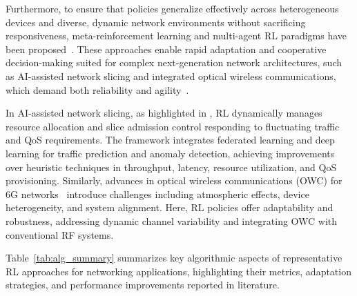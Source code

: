 \documentclass[sigconf]{acmart}
\begin{document}
Furthermore, to ensure that policies generalize effectively across heterogeneous devices and diverse, dynamic network environments without sacrificing responsiveness, meta-reinforcement learning and multi-agent RL paradigms have been proposed~\cite{ref14,ref6}. These approaches enable rapid adaptation and cooperative decision-making suited for complex next-generation network architectures, such as AI-assisted network slicing and integrated optical wireless communications, which demand both reliability and agility~\cite{ref6,ref14}.

In AI-assisted network slicing, as highlighted in \cite{ref6}, RL dynamically manages resource allocation and slice admission control responding to fluctuating traffic and QoS requirements. The framework integrates federated learning and deep learning for traffic prediction and anomaly detection, achieving improvements over heuristic techniques in throughput, latency, resource utilization, and QoS provisioning. Similarly, advances in optical wireless communications (OWC) for 6G networks~\cite{ref14} introduce challenges including atmospheric effects, device heterogeneity, and system alignment. Here, RL policies offer adaptability and robustness, addressing dynamic channel variability and integrating OWC with conventional RF systems.

Table~\ref{tab:alg_summary} summarizes key algorithmic aspects of representative RL approaches for networking applications, highlighting their metrics, adaptation strategies, and performance improvements reported in literature.
\end{document}
